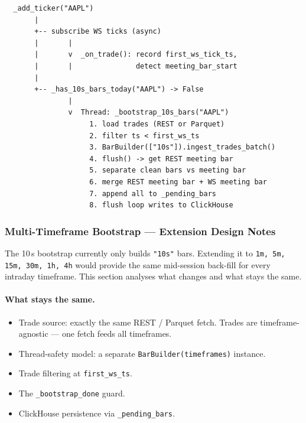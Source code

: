 \documentclass[a4paper, 11pt]{article}
\begin{document}
\begin{verbatim}
  _add_ticker("AAPL")
       |
       +-- subscribe WS ticks (async)
       |       |
       |       v  _on_trade(): record first_ws_tick_ts,
       |       |               detect meeting_bar_start
       |
       +-- _has_10s_bars_today("AAPL") -> False
               |
               v  Thread: _bootstrap_10s_bars("AAPL")
                    1. load trades (REST or Parquet)
                    2. filter ts < first_ws_ts
                    3. BarBuilder(["10s"]).ingest_trades_batch()
                    4. flush() -> get REST meeting bar
                    5. separate clean bars vs meeting bar
                    6. merge REST meeting bar + WS meeting bar
                    7. append all to _pending_bars
                    8. flush loop writes to ClickHouse
\end{verbatim}


\subsubsection{Multi-Timeframe Bootstrap --- Extension Design Notes}
\label{sec:multi-tf-bootstrap}

The 10\,s bootstrap currently only builds \texttt{"10s"} bars.  Extending it to
\texttt{1m, 5m, 15m, 30m, 1h, 4h} would provide the same mid-session back-fill
for every intraday timeframe.  This section analyses what changes and what stays
the same.

\paragraph{What stays the same.}
\begin{itemize}[nosep]
    \item Trade source: exactly the same REST / Parquet fetch.  Trades are
          timeframe-agnostic --- one fetch feeds all timeframes.
    \item Thread-safety model: a separate \texttt{BarBuilder(timeframes)} instance.
    \item Trade filtering at \texttt{first\_ws\_ts}.
    \item The \texttt{\_bootstrap\_done} guard.
    \item ClickHouse persistence via \texttt{\_pending\_bars}.
\end{itemize}
\end{document}
